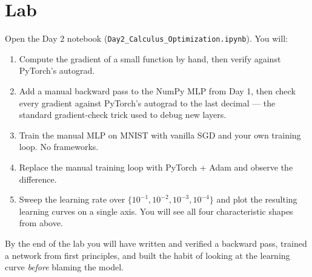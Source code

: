 \section*{Lab}

Open the Day 2 notebook (\texttt{Day2\_Calculus\_Optimization.ipynb}). You will:

\begin{enumerate}
  \item Compute the gradient of a small function by hand, then verify against PyTorch's autograd.
  \item Add a manual backward pass to the NumPy MLP from Day 1, then check every gradient against PyTorch's autograd to the last decimal --- the standard gradient-check trick used to debug new layers.
  \item Train the manual MLP on MNIST with vanilla SGD and your own training loop. No frameworks.
  \item Replace the manual training loop with PyTorch + Adam and observe the difference.
  \item Sweep the learning rate over $\{10^{-1}, 10^{-2}, 10^{-3}, 10^{-4}\}$ and plot the resulting learning curves on a single axis. You will see all four characteristic shapes from above.
\end{enumerate}

By the end of the lab you will have written and verified a backward pass, trained a network from first principles, and built the habit of looking at the learning curve \emph{before} blaming the model.
